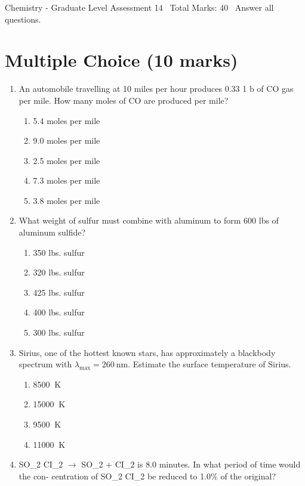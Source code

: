 \documentclass[12pt]{article}
\begin{document}
\begin{center}
Chemistry - Graduate Level Assessment 14 \
Total Marks: 40 \
Answer all questions.
\end{center}

\section*{Multiple Choice (10 marks)}
\begin{enumerate}[label=\arabic*.]
\item An automobile travelling at 10 miles per hour produces 0.33 1 b of CO gas per mile. How many moles of CO are produced per mile?
\begin{enumerate}[label=(\alph*)]
    \item 5.4 moles per mile
    \item 9.0 moles per mile
    \item 2.5 moles per mile
    \item 7.3 moles per mile
    \item 3.8 moles per mile
\end{enumerate}
\item What weight of sulfur must combine with aluminum to form 600 lbs of aluminum sulfide?
\begin{enumerate}[label=(\alph*)]
    \item 350 lbs. sulfur
    \item 320 lbs. sulfur
    \item 425 lbs. sulfur
    \item 400 lbs. sulfur
    \item 300 lbs. sulfur
\end{enumerate}
\item Sirius, one of the hottest known stars, has approximately a blackbody spectrum with $\lambda_{\max }=260 \mathrm{~nm}$. Estimate the surface temperature of Sirius.
\begin{enumerate}[label=(\alph*)]
    \item 8500 $\mathrm{~K}$
    \item 15000 $\mathrm{~K}$
    \item 9500 $\mathrm{~K}$
    \item 11000 $\mathrm{~K}$
\end{enumerate}
\item SO\_2 CI\_2 \ensuremath{\rightarrow} SO\_2 + CI\_2 is 8.0 minutes. In what period of time would the con- centration of SO\_2 CI\_2 be reduced to 1.0\% of the original?
\begin{enumerate}[label=(\alph*)]

\end{enumerate}
\end{enumerate}
\end{document}
